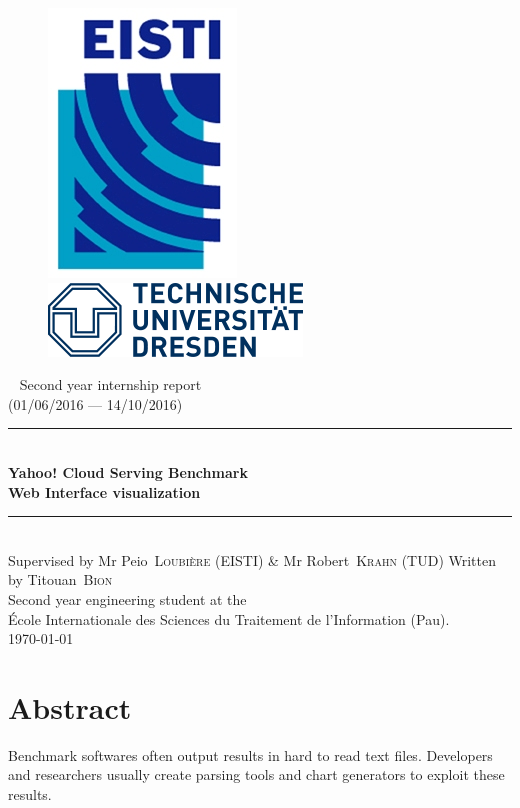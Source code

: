 \documentclass[a4paper,11pt]{report}
\newcommand*{\HRule}{\rule{\linewidth}{0.4mm}}  %
\newcommand*{\auteur}[2]{\large #1~\textsc{#2}} %
\newcommand{\pretitre}{Second year internship report \\ (01/06/2016 --- 14/10/2016)}
\newcommand{\grostitre}{Yahoo! Cloud Serving Benchmark \\ Web Interface visualization}
\newcommand{\auteurs}{Written by \auteur{Titouan}{Bion} \\ Second year engineering student at the \\ École Internationale des Sciences du Traitement de l'Information (Pau).}
\newcommand{\correcteurs}{Supervised by Mr \auteur{Peio}{Loubière} (EISTI) \& Mr \auteur{Robert}{Krahn} (TUD)}
\newcommand{\madate}{\today} %
\begin{document}


\begin{titlepage}
\begin{figure}[h]
\includegraphics[scale=1]{images/Logo_EISTI.png}
\hfill
\includegraphics[scale=0.6]{images/Logo_TUD.png}
\end{figure}
  \begin{center}
    ~
    \vfill
    {\Large\pretitre\\}           %
    \vspace{2cm}
    \HRule \\[0.4cm]
    {\Huge\bf\grostitre\\[0.4cm]} %
    \HRule \\[0.4cm]
    \vspace{2cm}
   	\correcteurs
    \medskip
    \vfill
    \auteurs\\                    %
    \vfill
    {\large\madate}               %
  \end{center}
\end{titlepage}

\chapter*{Abstract}

Benchmark softwares often output results in hard to read text files. Developers and researchers usually create parsing tools and chart generators to exploit these results.
\end{document}
